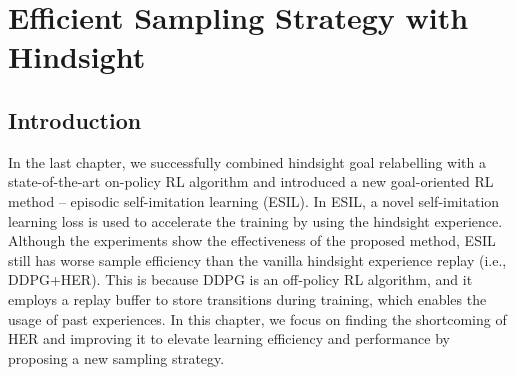 \chapter{Efficient Sampling Strategy with Hindsight}
\label{ch:dtgsh}
\section{Introduction}


In the last chapter, we successfully combined hindsight goal relabelling with a state-of-the-art on-policy RL algorithm and introduced a new goal-oriented RL method -- episodic self-imitation learning (ESIL). In ESIL, a novel self-imitation learning loss is used to accelerate the training by using the hindsight experience. Although the experiments show the effectiveness of the proposed method, ESIL still has worse sample efficiency than the vanilla hindsight experience replay (i.e., DDPG+HER). This is because DDPG is an off-policy RL algorithm, and it employs a replay buffer to store transitions during training, which enables the usage of past experiences. In this chapter, we focus on finding the shortcoming of HER and improving it to elevate learning efficiency and performance by proposing a new sampling strategy.

